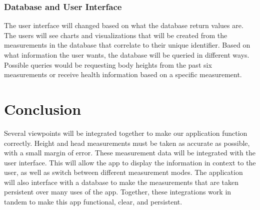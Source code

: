 \documentclass[onecolumn, draftclsnofoot,10pt, compsoc]{IEEEtran}
\begin{document}
\subsubsection{Database and User Interface}
The user interface will changed based on what the database return values are. The users will see charts and visualizations that will be created from the measurements in the database that correlate to their unique identifier. Based on what information the user wants, the database will be queried in different ways. Possible queries would be requesting body heights from the past six measurements or receive health information based on a specific measurement.



\section{Conclusion}
Several viewpoints will be integrated together to make our application function correctly. Height and head measurements must be taken as accurate as possible, with a small margin of error. These measurement data will be integrated with the user interface. This will allow the app to display the information in context to the user, as well as switch between different measurement modes. The application will also interface with a database to make the measurements that are taken persistent over many uses of the app. Together, these integrations work in tandem to make this app functional, clear, and persistent. 


\clearpage
\end{document}
